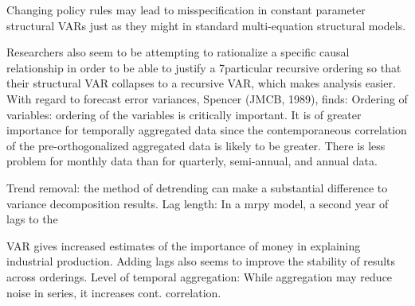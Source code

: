 \documentclass[
  ignorenonframetext,
]{beamer}
\begin{document}
\begin{frame}
Changing policy rules may lead to misspecification in constant parameter
structural VARs just as they might in standard multi-equation structural
models.

Researchers also seem to be attempting to rationalize a specific causal
relationship in order to be able to justify a 7particular recursive
ordering so that their structural VAR collapses to a recursive VAR,
which makes analysis easier. With regard to forecast error variances,
Spencer (JMCB, 1989), finds: Ordering of variables: ordering of the
variables is critically important. It is of greater importance for
temporally aggregated data since the contemporaneous correlation of the
pre-orthogonalized aggregated data is likely to be greater. There is
less problem for monthly data than for quarterly, semi-annual, and
annual data.

Trend removal: the method of detrending can make a substantial
difference to variance decomposition results. Lag length: In a mrpy
model, a second year of lags to the

VAR gives increased estimates of the importance of money in explaining
industrial production. Adding lags also seems to improve the stability
of results across orderings. Level of temporal aggregation: While
aggregation may reduce noise in series, it increases cont. correlation.
\end{frame}
\end{document}
